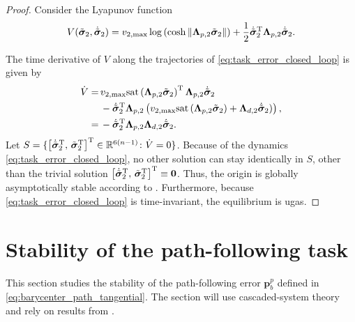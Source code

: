 \begin{proof}
Consider the Lyapunov function
    \begin{equation}
  V(\Tilde{\bm{\sigma}}_2, \dot{\Tilde{\bm{\sigma}}}_2)  = v_{2,\max}\log\left(\cosh{\|\mathbf{\Lambda}_{p,2}\Tilde{\bm{\sigma}}_{2}\|}\right)+ \frac{1}{2}\dot{\Tilde{\bm{\sigma}}}_2^{\rm T}\mathbf{\Lambda}_{p,2}\dot{\Tilde{\bm{\sigma}}}_2.
\end{equation}

The time derivative of $V$ along the trajectories of \eqref{eq:task_error_closed_loop} is given by
\begin{equation}
\begin{split}
    \dot{V} =\, & v_{2,\max}\mathrm{sat}\left(\mathbf{\Lambda}_{p,2}\Tilde{\bm{\sigma}}_{2}\right)^{\rm T} \mathbf{\Lambda}_{p,2} \dot{\Tilde{\bm{\sigma}}}_2 \\&-
    \dot{\Tilde{\bm{\sigma}}}_2^{\rm T} \mathbf{\Lambda}_{p,2}\left(v_{2,\max}\mathrm{sat}\left(\mathbf{\Lambda}_{p,2}\Tilde{\bm{\sigma}}_{2}\right) + \mathbf{\Lambda}_{d,2}\dot{\Tilde{\bm{\sigma}}}_2)\right),\\
    =\,&-\dot{\Tilde{\bm{\sigma}}}_2^{\rm T}\mathbf{\Lambda}_{p,2} \mathbf{\Lambda}_{d,2}\dot{\Tilde{\bm{\sigma}}}_2.
    \end{split}
\end{equation}
Let $S = \{\bigl[\dot{\Tilde{\bm{\sigma}}}_2^{\rm T},\, \Tilde{\bm{\sigma}}_2^{\rm T}\bigr]^{\rm T} \in \mathbb{R}^{6(n-1)} \colon \dot{V} = 0\}$. Because of the dynamics \eqref{eq:task_error_closed_loop}, no other solution can stay identically in $S$, other than the trivial solution $\bigl[\dot{\Tilde{\bm{\sigma}}}_2^{\rm T},\, \Tilde{\bm{\sigma}}_2^{\rm T}\bigr]^{\rm T} \equiv \mathbf{0}$. Thus, the origin is globally asymptotically stable according to \cite[Corollary 4.2]{khalil_nonlinear_2002}. Furthermore, because \eqref{eq:task_error_closed_loop} is time-invariant, the equilibrium is \gls{ugas}.
\end{proof}

\section{Stability of the path-following task}\label{sec:closed_loop_path_following}
This section studies the stability of the path-following error $\mathbf{p}_b^p$ defined in \eqref{eq:barycenter_path_tangential}. The section will use cascaded-system theory and rely on results from \cite{matous_singularity-free_2022}.

